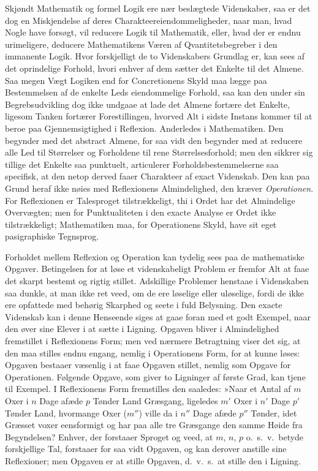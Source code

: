 \documentclass[12pt]{book}
\newcommand{\apage}[1]{\marginnote{\footnotesize\textit{[#1]}}}
\begin{document}
\noindent Skjøndt Mathematik og formel Logik ere nær beslægtede
Videnskaber, saa er det dog en Miskjendelse af deres
Charakteereiendommeligheder, naar man, hvad Nogle have forsøgt, vil
reducere Logik til Mathematik, eller, hvad der er endnu urimeligere,
deducere Mathematikens Væren af Qvantitetsbegreber i den immanente Logik.
Hvor forskjelligt de to Videnskabers Grundlag er, kan sees af det
oprindelige Forhold, hvori enhver af dem sætter det Enkelte til det Almene.
Saa megen Vægt Logiken end for Concretionens Skyld maa lægge paa
Bestemmelsen af de enkelte Leds eiendommelige Forhold, saa kan den under
sin Begrebsudvikling dog ikke undgaae at lade det Almene fortære det
Enkelte, ligesom Tanken fortærer Forestillingen, hvorved Alt i sidste
Instans kommer til at beroe paa Gjennemsigtighed i Reflexion. Anderledes i
Mathematiken. Den begynder med det abstract Almene, \apage{118} for saa vidt den
begynder med at reducere alle Led til Størrelser og Forholdene til rene
Størrelsesforhold; men den sikkrer sig tillige det Enkelte saa punktuelt,
articulerer Forholdsbestemmelserne saa specifisk, at den netop derved faaer
Charakteer af exact Videnskab. Den kan paa Grund heraf ikke nøies med
Reflexionens Almindelighed, den kræver \emph{Operationen}. For Reflexionen er
Talesproget tilstrækkeligt, thi i Ordet har det Almindelige Overvægten; men
for Punktualiteten i den exacte Analyse er Ordet ikke tilstrækkeligt;
Mathematiken maa, for Operationens Skyld, have sit eget pasigraphiske
Tegnsprog.

Forholdet mellem Reflexion og Operation kan tydelig sees paa de
mathematiske Opgaver. Betingelsen for at løse et videnskabeligt Problem er
fremfor Alt at faae det skarpt bestemt og rigtig stillet. Adskillige
Problemer henstaae i Videnskaben saa dunkle, at man ikke ret veed, om de
ere løselige eller uløselige, fordi de ikke ere opfattede med behørig
Skarphed og seete i fuld Belysning. Den exacte Videnskab kan i denne
Henseende siges at gaae foran med et godt Exempel, naar den øver sine
Elever i at sætte i Ligning. Opgaven bliver i Almindelighed fremstillet i
Reflexionens Form; men ved nærmere Betragtning viser det sig, at den maa
stilles endnu engang, nemlig i Operationens Form, for at kunne løses:
Opgaven bestaaer væsenlig i at faae Opgaven stillet, nemlig som Opgave for
Operationen. Følgende Opgave, som giver to Ligninger af første Grad, kan
tjene til Exempel. I Reflexionens Form fremstilles den saaledes: »Naar \apage{119} et
Antal af $m$ Oxer i $n$ Dage afæde $p$ Tønder Land Græsgang, ligeledes $m'$
Oxer i $n'$ Dage $p'$ Tønder Land, hvormange Oxer ($m''$) ville da i $n''$
Dage afæde $p''$ Tønder, idet Græsset voxer eensformigt og har paa alle tre
Græsgange den samme Høide fra Begyndelsen? Enhver, der forstaaer Sproget og
veed, at $m$, $n$, $p$ o.\ s.\ v.\ betyde forskjellige Tal, forstaaer for saa
vidt Opgaven, og kan derover anstille sine Reflexioner; men Opgaven er at
stille Opgaven, d.\ v.\ s.\ at stille den i Ligning.
\end{document}

